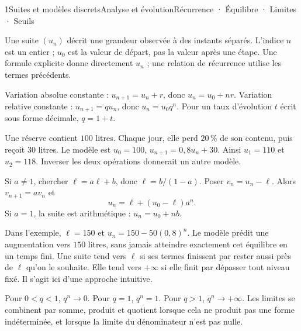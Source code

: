 \begin{ouverture}[suites]{1}{Suites et modèles discrets}{Analyse et évolution}{Récurrence · Équilibre · Limites · Seuils}
\end{ouverture}
\essentiel

Une suite $(u_n)$ décrit une grandeur observée à des instants séparés. L'indice $n$ est un entier ; $u_0$ est la valeur de départ, pas la valeur après une étape. Une formule explicite donne directement $u_n$ ; une relation de récurrence utilise les termes précédents.
\begin{definition}
Variation absolue constante : $u_{n+1}=u_n+r$, donc $u_n=u_0+nr$.
Variation relative constante : $u_{n+1}=qu_n$, donc $u_n=u_0q^n$.
Pour un taux d'évolution $t$ écrit sous forme décimale, $q=1+t$.
\end{definition}
\begin{exemple}
Une réserve contient $100$ litres. Chaque jour, elle perd $20\,\%$ de son contenu, puis reçoit $30$ litres. Le modèle est $u_0=100$, $u_{n+1}=0{,}8u_n+30$.
Ainsi $u_1=110$ et $u_2=118$. Inverser les deux opérations donnerait un autre modèle.
\end{exemple}
\begin{savoirfaire}[Résoudre $u_{n+1}=au_n+b$]
Si $a\ne1$, chercher $\ell=a\ell+b$, donc $\ell=b/(1-a)$. Poser $v_n=u_n-\ell$.
Alors $v_{n+1}=av_n$ et
\[u_n=\ell+(u_0-\ell)a^n.\]
Si $a=1$, la suite est arithmétique : $u_n=u_0+nb$.
\end{savoirfaire}
Dans l'exemple, $\ell=150$ et $u_n=150-50(0{,}8)^n$.
Le modèle prédit une augmentation vers $150$ litres, sans jamais atteindre exactement cet équilibre en un temps fini.
Une suite tend vers $\ell$ si ses termes finissent par rester aussi près de $\ell$ qu'on le souhaite. Elle tend vers $+\infty$ si elle finit par dépasser tout niveau fixé. Il s'agit ici d'une approche intuitive.
\begin{propriete}
Pour $0<q<1$, $q^n\longrightarrow0$. Pour $q=1$, $q^n=1$. Pour $q>1$, $q^n\longrightarrow+\infty$.
Les limites se combinent par somme, produit et quotient lorsque cela ne produit pas une forme indéterminée, et lorsque la limite du dénominateur n'est pas nulle.
\end{propriete}
